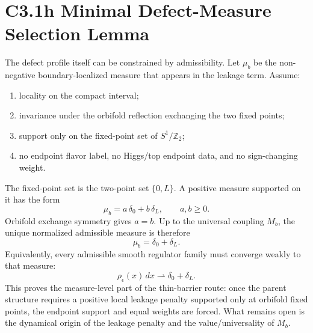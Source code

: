 \documentclass[11pt]{article}
\begin{document}
\section{C3.1h Minimal Defect-Measure Selection Lemma}
The defect profile itself can be constrained by admissibility.  Let $\mu_b$ be
the non-negative boundary-localized measure that appears in the leakage term.
Assume:
\begin{enumerate}
\item locality on the compact interval;
\item invariance under the orbifold reflection exchanging the two fixed points;
\item support only on the fixed-point set of $S^1/\mathbb Z_2$;
\item no endpoint flavor label, no Higgs/top endpoint data, and no sign-changing
weight.
\end{enumerate}
The fixed-point set is the two-point set $\{0,L\}$.  A positive measure
supported on it has the form
\begin{equation}
\mu_b=a\,\delta_0+b\,\delta_L,\qquad a,b\geq0 .
\end{equation}
Orbifold exchange symmetry gives $a=b$.  Up to the universal coupling
$M_b$, the unique normalized admissible measure is therefore
\begin{equation}
\mu_b=\delta_0+\delta_L .
\end{equation}
Equivalently, every admissible smooth regulator family must converge weakly to
that measure:
\begin{equation}
\rho_\epsilon(x)\,dx\rightharpoonup \delta_0+\delta_L .
\end{equation}
This proves the measure-level part of the thin-barrier route: once the parent
structure requires a positive local leakage penalty supported only at orbifold
fixed points, the endpoint support and equal weights are forced.  What remains
open is the dynamical origin of the leakage penalty and the value/universality
of $M_b$.
\end{document}
